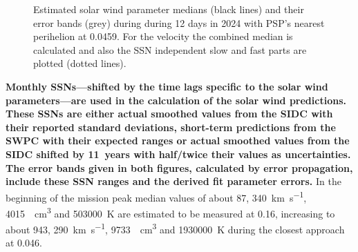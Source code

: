 \begin{figure}
	\caption{Estimated solar wind parameter medians (black lines) and their error bands (grey) during during 12 days in 2024 with PSP's nearest perihelion at \SI{0.0459}{\au}. For the velocity the combined median is calculated and also the SSN independent slow and fast parts are plotted (dotted lines).}
	\label{fig:SPP_perihelia_prediction_nearest_e_plot}
\end{figure}
\textbf{Monthly SSNs---shifted by the time lags specific to the solar wind parameters---are used in the calculation of the solar wind predictions. These SSNs are either actual smoothed values from the SIDC with their reported standard deviations, short-term predictions from the SWPC with their expected ranges or actual smoothed values from the SIDC shifted by 11~years with half/twice their values as uncertainties. The error bands given in both figures, calculated by error propagation, include these SSN ranges and the derived fit parameter errors.} In the beginning of the mission peak median values of about \SI{87}{\nT}, \SI{340}{\km\per\s}, \SI{4015}{\per\cm\cubed} and \SI{503000}{\K} are estimated to be measured at \SI{0.16}{\au}, increasing to about \SI{943}{\nT}, \SI{290}{\km\per\s}, \SI{9733}{\per\cm\cubed} and \SI{1930000}{\K} during the closest approach at \SI{0.046}{\au}.


